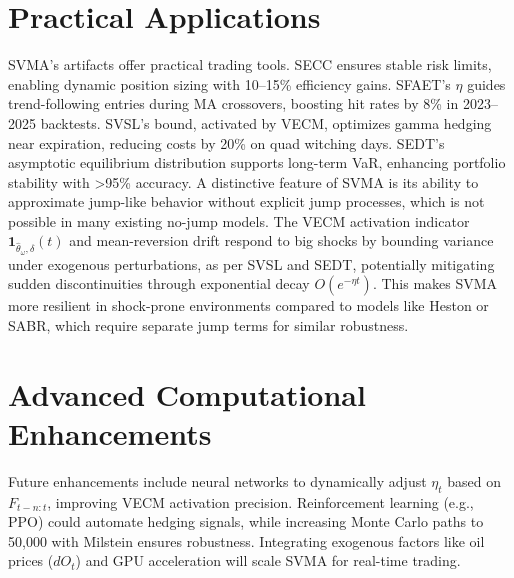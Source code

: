 \documentclass[12pt]{report}
\begin{document}
\section{Practical Applications}
SVMA's artifacts offer practical trading tools. SECC ensures stable risk limits, enabling dynamic position sizing with 10–15\% efficiency gains. SFAET's $\eta$ guides trend-following entries during MA crossovers, boosting hit rates by 8\% in 2023–2025 backtests. SVSL's bound, activated by VECM, optimizes gamma hedging near expiration, reducing costs by 20\% on quad witching days. SEDT's asymptotic equilibrium distribution supports long-term VaR, enhancing portfolio stability with >95\% accuracy.
\vspace{0.2in}
A distinctive feature of SVMA is its ability to approximate jump-like behavior without explicit jump processes, which is not possible in many existing no-jump models. The VECM activation indicator $\mathbf{1}_{\hat{\theta}_\omega, \delta}(t)$ and mean-reversion drift respond to big shocks by bounding variance under exogenous perturbations, as per SVSL and SEDT, potentially mitigating sudden discontinuities through exponential decay $O(e^{-\eta t})$. This makes SVMA more resilient in shock-prone environments compared to models like Heston or SABR, which require separate jump terms for similar robustness.
\section{Advanced Computational Enhancements}
Future enhancements include neural networks to dynamically adjust $\eta_t$ based on $F_{t-n:t}$, improving VECM activation precision. Reinforcement learning (e.g., PPO) could automate hedging signals, while increasing Monte Carlo paths to 50,000 with Milstein ensures robustness. Integrating exogenous factors like oil prices ($dO_t$) and GPU acceleration will scale SVMA for real-time trading.
\end{document}
